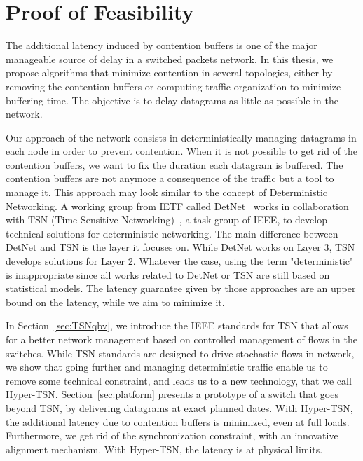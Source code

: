 
\chapter{Proof of Feasibility}
\label{chap:TSN}
\minitoc

The additional latency induced by contention buffers is one of the major manageable source of delay in a switched packets network.
In this thesis, we propose algorithms that minimize contention in several topologies, either by removing the contention buffers or computing traffic organization to minimize buffering time. The objective is to delay datagrams as little as possible in the network.

Our approach of the network consists in deterministically managing datagrams in each node in order to prevent contention. When it is not possible to get rid of the contention buffers, we want to fix the duration each datagram is buffered. The contention buffers are not anymore a consequence of the traffic but a tool to manage it. This approach may look similar to the concept of Deterministic Networking. A working group from IETF called DetNet~\cite{finn-detnet-architecture-08} works in collaboration with TSN (Time Sensitive Networking)~\cite{ieee802}, a task group of IEEE, to develop technical solutions for deterministic networking. The main difference between DetNet and TSN is the layer it focuses on. While DetNet works on Layer 3, TSN develops solutions for Layer 2. Whatever the case, using the term "deterministic" is inappropriate since all works related to DetNet or TSN are still based on statistical models. The latency guarantee given by those approaches are an upper bound on the latency, while we aim to minimize it.

In Section~\ref{sec:TSNqbv}, we introduce the IEEE standards for TSN that allows for a better network management based on controlled management of flows in the switches. While TSN standards are designed to drive stochastic flows in network, we show that going further and managing deterministic traffic enable us to remove some technical constraint, and leads us to a new technology, that we call Hyper-TSN. Section~\ref{sec:platform} presents a prototype of a switch that goes beyond TSN, by delivering datagrams at exact planned dates. With Hyper-TSN, the additional latency due to contention buffers is minimized, even at full loads. Furthermore, we get rid of the synchronization constraint, with an innovative alignment mechanism. With Hyper-TSN, the latency is at physical limits.
\cite{metricsietf}

